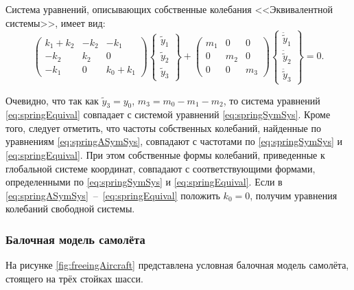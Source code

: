Система уравнений, описывающих собственные колебания <<Эквивалентной системы>>, имеет вид:
\begin{equation}
	\begin{pmatrix}
		k_1+k_2 & -k_2 & -k_1 \\
		-k_2 & k_2 & 0 \\
		-k_1 & 0 & k_0+k_1
	\end{pmatrix}
	\begin{Bmatrix}
		\tilde{y}_1 \\ \tilde{y}_2 \\ \tilde{y}_3
	\end{Bmatrix} +
	\begin{pmatrix}
		m_1 & 0 & 0 \\
		0 & m_2 & 0 \\
		0 & 0 & m_3
	\end{pmatrix}
	\begin{Bmatrix}
		\ddot{\tilde{y}}_1 \\ \ddot{\tilde{y}}_2 \\ \ddot{\tilde{y}}_3
	\end{Bmatrix} = 0.
	\label{eq:springEquival}
\end{equation}

Очевидно, что так как $ \tilde{y}_3 = y_0 $, $ m_3 = m_0 - m_1 - m_2$, то система уравнений \eqref{eq:springEquival} совпадает с системой уравнений \eqref{eq:springSymSys}. Кроме того, следует отметить, что частоты собственных колебаний, найденные по уравнениям \eqref{eq:springASymSys}, совпадают с частотами по \eqref{eq:springSymSys} и \eqref{eq:springEquival}. При этом собственные формы колебаний, приведенные к глобальной системе координат, совпадают с соответствующими формами, определенными по \eqref{eq:springSymSys} и \eqref{eq:springEquival}. Если в \eqref{eq:springASymSys}~--~\eqref{eq:springEquival} положить $ k_0 = 0$, получим уравнения колебаний свободной системы.

\subsubsection{Балочная модель самолёта}

На рисунке \ref{fig:freeingAircraft} представлена условная балочная модель самолёта, стоящего на трёх стойках шасси.

